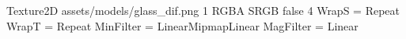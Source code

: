 Texture2D
assets/models/glass_dif.png
1
RGBA
SRGB
false
4
WrapS = Repeat
WrapT = Repeat
MinFilter = LinearMipmapLinear
MagFilter = Linear
